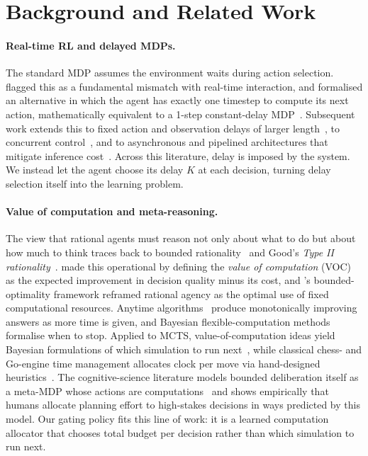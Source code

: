 \section{Background and Related Work}

\paragraph{Real-time RL and delayed MDPs.}
The standard MDP assumes the environment waits during action selection.
\citet{travnik2018reactive} flagged this as a fundamental mismatch with
real-time interaction, and \citet{ramstedt2019rtrl} formalised an alternative
in which the agent has exactly one timestep to compute its next action,
mathematically equivalent to a 1-step constant-delay
MDP~\citep{walsh2009delayed}.
Subsequent work extends this to fixed action and observation delays of
larger length~\citep{derman2021delayed,bouteiller2021random,katsikopoulos2003markov},
to concurrent control~\citep{xiao2020thinking}, and to asynchronous and
pipelined architectures that mitigate inference cost~\citep{riemer2025staggered,
anokhin2025handling}.
Across this literature, delay is imposed by the system.
We instead let the agent choose its delay $K$ at each decision, turning
delay selection itself into the learning problem.

\paragraph{Value of computation and meta-reasoning.}
The view that rational agents must reason not only about what to do but
about how much to think traces back to bounded
rationality~\citep{simon1955behavioral} and Good's \emph{Type II
rationality}~\citep{good1971twentyseven}.
\citet{russell1991right} made this operational by defining the
\emph{value of computation} (VOC) as the expected improvement in decision
quality minus its cost, and \citet{russell1995provably}'s
bounded-optimality framework reframed rational agency as the optimal use
of fixed computational resources.
Anytime algorithms~\citep{dean1988analysis,zilberstein1996using,
likhachev2003ara,korf1990rta} produce monotonically improving answers as
more time is given, and Bayesian flexible-computation
methods~\citep{horvitz1988reasoning} formalise when to stop.
Applied to MCTS, value-of-computation ideas yield Bayesian formulations
of which simulation to run next~\citep{hay2012selecting,tolpin2012simple,
sezener2020static,lin2015metareasoning}, while classical chess- and
Go-engine time management allocates clock per move via hand-designed
heuristics~\citep{baier2016time,huang2010timemanagement,baudis2012pachi}.
The cognitive-science literature models bounded deliberation itself as a
meta-MDP whose actions are computations~\citep{lieder2017strategy,
griffiths2019doing,callaway2018learning,cope_learning_2023} and shows
empirically that humans allocate planning effort to high-stakes
decisions in ways predicted by this model.
Our gating policy fits this line of work: it is a learned computation
allocator that chooses total budget per decision rather than which
simulation to run next.


